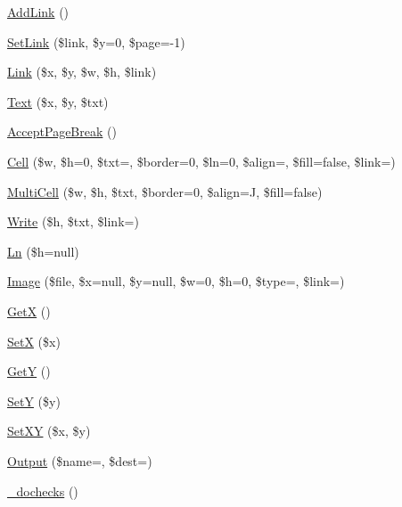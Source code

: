 \begin{DoxyCompactItemize}
\item 
\hyperlink{class_f_p_d_f_ae5905a6270028a055eb4b7e6f3def713}{Add\+Link} ()
\item 
\hyperlink{class_f_p_d_f_a83120ec749f1a41b825108c493c97564}{Set\+Link} (\$link, \$y=0, \$page=-\/1)
\item 
\hyperlink{class_f_p_d_f_a818159ed11bab8ca6ca0b1ea3f37f537}{Link} (\$x, \$y, \$w, \$h, \$link)
\item 
\hyperlink{class_f_p_d_f_abb693168e0ea67fac4309f89d67fd4fc}{Text} (\$x, \$y, \$txt)
\item 
\hyperlink{class_f_p_d_f_a04677ba6156d261fc1cbe51a3041eb24}{Accept\+Page\+Break} ()
\item 
\hyperlink{class_f_p_d_f_a0e190676315f5c08794034bd3d9cb073}{Cell} (\$w, \$h=0, \$txt=\textquotesingle{}\textquotesingle{}, \$border=0, \$ln=0, \$align=\textquotesingle{}\textquotesingle{}, \$fill=false, \$link=\textquotesingle{}\textquotesingle{})
\item 
\hyperlink{class_f_p_d_f_a83d05ed30ef47ec3e5722850e4ef50d6}{Multi\+Cell} (\$w, \$h, \$txt, \$border=0, \$align=\textquotesingle{}J\textquotesingle{}, \$fill=false)
\item 
\hyperlink{class_f_p_d_f_a7c544835cb8490e81866ab8a831cb101}{Write} (\$h, \$txt, \$link=\textquotesingle{}\textquotesingle{})
\item 
\hyperlink{class_f_p_d_f_a13ddcf5ade8959053e62198a3a88a3ff}{Ln} (\$h=null)
\item 
\hyperlink{class_f_p_d_f_adfca5f603e68f92d5cf2d6b82b275597}{Image} (\$file, \$x=null, \$y=null, \$w=0, \$h=0, \$type=\textquotesingle{}\textquotesingle{}, \$link=\textquotesingle{}\textquotesingle{})
\item 
\hyperlink{class_f_p_d_f_a95399091cc57512472ac27cc258486fe}{Get\+X} ()
\item 
\hyperlink{class_f_p_d_f_a8794ca7726edaf339b07c400dbe4920a}{Set\+X} (\$x)
\item 
\hyperlink{class_f_p_d_f_a6677aaf0484d3b84549d26cd7506b3ca}{Get\+Y} ()
\item 
\hyperlink{class_f_p_d_f_afaf7c0010d3e4c58b1865c63f2c7c500}{Set\+Y} (\$y)
\item 
\hyperlink{class_f_p_d_f_a321a64057625f46db2a6f67650fc7fa5}{Set\+X\+Y} (\$x, \$y)
\item 
\hyperlink{class_f_p_d_f_aa774db9e49b78ed6743cd918c68bd4e6}{Output} (\$name=\textquotesingle{}\textquotesingle{}, \$dest=\textquotesingle{}\textquotesingle{})
\item 
\hyperlink{class_f_p_d_f_a9c05e5315160a62a4feb564def81701e}{\+\_\+dochecks} ()

\end{DoxyCompactItemize}
